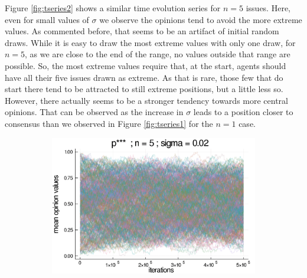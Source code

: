 \documentclass{article}
\begin{document}
{    Figure \ref{fig:tseries2} shows a similar time evolution series for $n=5$
    issues. Here, even for small values of $\sigma$ we observe the opinions tend
    to avoid the more extreme values. As commented before, that seems to be an artifact of initial
    random draws. While it is easy to draw the most extreme values with only one
    draw, for $n=5$, as we are close to the end of the range, no values outside
    that range are possible. So, the most extreme values require that, at the
    start, agents should have all their five issues drawn as extreme. As that is
    rare, those few that do start there tend to be attracted to still extreme
    positions, but a little less so. However, there actually seems to be a stronger
    tendency towards more central opinions. That can be observed as the increase in $\sigma$
    leads to a position closer to consensus than we observed in Figure \ref{fig:tseries1} for the $n=1$ case.





    \begin{figure}[H]
      \centering
      \begin{subfigure}[b]{0.48\textwidth}
        \includegraphics[width=\textwidth]{img/series/tseries2/Poodlcalculatepsssn5-rho005-sigma002-00intransrandom.png}
      \end{subfigure}


\end{figure}}
\end{document}
